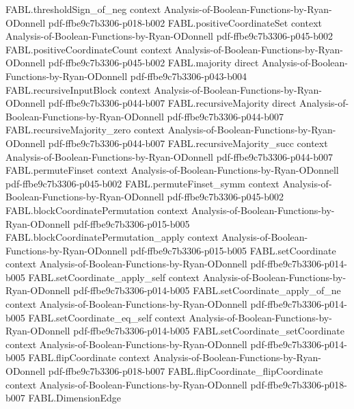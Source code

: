 \begin{theorem}
\proofstep
  {FABL.thresholdSign_of_neg}
  {context}
  {Analysis-of-Boolean-Functions-by-Ryan-ODonnell}
  {pdf-ffbe9c7b3306-p018-b002}
\proofstep
  {FABL.positiveCoordinateSet}
  {context}
  {Analysis-of-Boolean-Functions-by-Ryan-ODonnell}
  {pdf-ffbe9c7b3306-p045-b002}
\proofstep
  {FABL.positiveCoordinateCount}
  {context}
  {Analysis-of-Boolean-Functions-by-Ryan-ODonnell}
  {pdf-ffbe9c7b3306-p045-b002}
\proofstep
  {FABL.majority}
  {direct}
  {Analysis-of-Boolean-Functions-by-Ryan-ODonnell}
  {pdf-ffbe9c7b3306-p043-b004}
\proofstep
  {FABL.recursiveInputBlock}
  {context}
  {Analysis-of-Boolean-Functions-by-Ryan-ODonnell}
  {pdf-ffbe9c7b3306-p044-b007}
\proofstep
  {FABL.recursiveMajority}
  {direct}
  {Analysis-of-Boolean-Functions-by-Ryan-ODonnell}
  {pdf-ffbe9c7b3306-p044-b007}
\proofstep
  {FABL.recursiveMajority_zero}
  {context}
  {Analysis-of-Boolean-Functions-by-Ryan-ODonnell}
  {pdf-ffbe9c7b3306-p044-b007}
\proofstep
  {FABL.recursiveMajority_succ}
  {context}
  {Analysis-of-Boolean-Functions-by-Ryan-ODonnell}
  {pdf-ffbe9c7b3306-p044-b007}
\proofstep
  {FABL.permuteFinset}
  {context}
  {Analysis-of-Boolean-Functions-by-Ryan-ODonnell}
  {pdf-ffbe9c7b3306-p045-b002}
\proofstep
  {FABL.permuteFinset_symm}
  {context}
  {Analysis-of-Boolean-Functions-by-Ryan-ODonnell}
  {pdf-ffbe9c7b3306-p045-b002}
\proofstep
  {FABL.blockCoordinatePermutation}
  {context}
  {Analysis-of-Boolean-Functions-by-Ryan-ODonnell}
  {pdf-ffbe9c7b3306-p015-b005}
\proofstep
  {FABL.blockCoordinatePermutation_apply}
  {context}
  {Analysis-of-Boolean-Functions-by-Ryan-ODonnell}
  {pdf-ffbe9c7b3306-p015-b005}
\proofstep
  {FABL.setCoordinate}
  {context}
  {Analysis-of-Boolean-Functions-by-Ryan-ODonnell}
  {pdf-ffbe9c7b3306-p014-b005}
\proofstep
  {FABL.setCoordinate_apply_self}
  {context}
  {Analysis-of-Boolean-Functions-by-Ryan-ODonnell}
  {pdf-ffbe9c7b3306-p014-b005}
\proofstep
  {FABL.setCoordinate_apply_of_ne}
  {context}
  {Analysis-of-Boolean-Functions-by-Ryan-ODonnell}
  {pdf-ffbe9c7b3306-p014-b005}
\proofstep
  {FABL.setCoordinate_eq_self}
  {context}
  {Analysis-of-Boolean-Functions-by-Ryan-ODonnell}
  {pdf-ffbe9c7b3306-p014-b005}
\proofstep
  {FABL.setCoordinate_setCoordinate}
  {context}
  {Analysis-of-Boolean-Functions-by-Ryan-ODonnell}
  {pdf-ffbe9c7b3306-p014-b005}
\proofstep
  {FABL.flipCoordinate}
  {context}
  {Analysis-of-Boolean-Functions-by-Ryan-ODonnell}
  {pdf-ffbe9c7b3306-p018-b007}
\proofstep
  {FABL.flipCoordinate_flipCoordinate}
  {context}
  {Analysis-of-Boolean-Functions-by-Ryan-ODonnell}
  {pdf-ffbe9c7b3306-p018-b007}
\proofstep
  {FABL.DimensionEdge}

\end{theorem}
